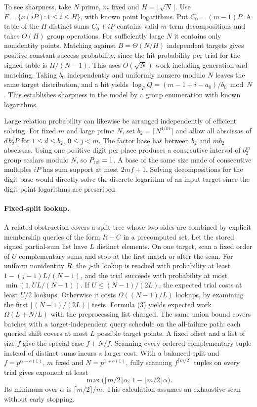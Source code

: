 \documentclass[11pt]{article}
\begin{document}
To see sharpness, take \(N\) prime, \(m\) fixed and \(H=\lfloor\sqrt N\rfloor\). Use \(F=\{x(iP):1\le i\le H\}\), with known point logarithms. Put \(C_0=(m-1)P\). A table of the \(H\) distinct sums \(C_0+iP\) contains valid \(m\)-term decompositions and takes \(O(H)\) group operations. For sufficiently large \(N\) it contains only nonidentity points. Matching against \(B=\Theta(N/H)\) independent targets gives positive constant success probability, since the hit probability per trial for the signed table is \(H/(N-1)\). This uses \(\widetilde O(\sqrt N)\) work including generation and matching. Taking \(b_0\) independently and uniformly nonzero modulo \(N\) leaves the same target distribution, and a hit yields \(\log_PQ=(m-1+i-a_0)/b_0\bmod N\). This establishes sharpness in the model by a group enumeration with known logarithms.

Large relation probability can likewise be arranged independently of efficient solving. For fixed \(m\) and large prime \(N\), set \(b_2=\lceil N^{1/m}\rceil\) and allow all abscissas of \(d\,b_2^jP\) for \(1\le d\le b_2,\ 0\le j<m\). The factor base has between \(b_2\) and \(mb_2\) abscissas. Using one positive digit per place produces a consecutive interval of \(b_2^m\) group scalars modulo \(N\), so \(P_{\rm rel}=1\). A base of the same size made of consecutive multiples \(iP\) has sum support at most \(2mf+1\). Solving decompositions for the digit base would directly solve the discrete logarithm of an input target since the digit-point logarithms are prescribed.

\paragraph{Fixed-split lookup.}
A related obstruction covers a split tree whose two sides are combined by explicit membership queries of the form \(R-C\) in a precomputed set. Let the stored signed partial-sum list have \(L\) distinct elements. On one target, scan a fixed order of \(U\) complementary sums and stop at the first match or after the scan. For uniform nonidentity \(R\), the \(j\)-th lookup is reached with probability at least \(1-(j-1)L/(N-1)\), and the trial succeeds with probability at most \(\min(1,UL/(N-1))\). If \(U\le(N-1)/(2L)\), the expected trial costs at least \(U/2\) lookups. Otherwise it costs \(\Omega((N-1)/L)\) lookups, by examining the first \(\lceil(N-1)/(2L)\rceil\) tests. Formula (3) yields expected work \(\Omega(L+N/L)\) with the preprocessing list charged. The same union bound covers batches with a target-independent query schedule on the all-failure path: each queried shift covers at most \(L\) possible target points. A fixed offset and a list of size \(f\) give the special case \(f+N/f\). Scanning every ordered complementary tuple instead of distinct sums incurs a larger cost. With a balanced split and \(f=p^{\alpha+o(1)}\), \(m\) fixed and \(N=p^{1+o(1)}\), fully scanning \(f^{\lceil m/2\rceil}\) tuples on every trial gives exponent at least
\[
\max\bigl(\lceil m/2\rceil\alpha,\,1-\lfloor m/2\rfloor\alpha\bigr).
\]
Its minimum over \(\alpha\) is \(\lceil m/2\rceil/m\). This calculation assumes an exhaustive scan without early stopping.
\end{document}
